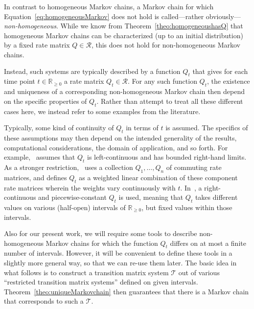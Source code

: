 \documentclass[10pt]{paper}
\theoremstyle{definition}
\newcommand{\reals}{\mathbb{R}}
\newcommand{\realsnonneg}{\reals_{\geq 0}}
\begin{document}
In contrast to homogeneous Markov chains, a Markov chain for which Equation~\eqref{eq:homogeneousMarkov} does not hold is called---rather obviously---\emph{non-homogeneous}. While we know from Theorem~\ref{theo:homogeneoushasQ} that homogeneous Markov chains can be characterized (up to an initial distribution) by a fixed rate matrix $Q\in\mathcal{R}$, this does not hold for non-homogeneous Markov chains. 

Instead, such systems are typically described by a function $Q_t$ that gives for each time point $t\in\realsnonneg$ a rate matrix $Q_t\in\mathcal{R}$. For any such function $Q_t$, the existence and uniqueness of a corresponding non-homogeneous Markov chain then depend on the specific properties of $Q_t$. Rather than attempt to treat all these different cases here, we instead refer to some examples from the literature. 

Typically, some kind of continuity of $Q_t$ in terms of $t$ is assumed. The specifics of these assumptions may then depend on the intended generality of the results, computational considerations, the domain of application, and so forth. For example,~\cite{aalen1978empirical} assumes that $Q_t$ is left-continuous and has bounded right-hand limits. As a stronger restriction,~\cite{johnson1989nonhomogeneous} uses a collection $Q_1,\ldots,Q_n$ of commuting rate matrices, and defines $Q_t$ as a weighted linear combination of these component rate matrices wherein the weights vary continuously with $t$. In~\cite{rindos1995exact}, a right-continuous and piecewise-constant $Q_t$ is used, meaning that $Q_t$ takes different values on various (half-open) intervals of $\realsnonneg$, but fixed values within those intervals.

Also for our present work, we will require some tools to describe non-homogeneous Markov chains for which the function $Q_t$ differs on at most a finite number of intervals. However, it will be convenient to define these tools in a slightly more general way, so that we can re-use them later. The basic idea in what follows is to construct a transition matrix system $\mathcal{T}$ out of various ``restricted transition matrix systems'' defined on given intervals. Theorem~\ref{theo:uniqueMarkovchain} then guarantees that there is a Markov chain that corresponds to such a $\mathcal{T}$.

\end{document}
